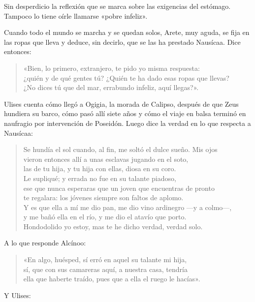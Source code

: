 Sin desperdicio la reflexión que se marca sobre las exigencias del estómago. Tampoco lo tiene oírle llamarse «pobre infeliz».

Cuando todo el mundo se marcha y se quedan solos, Arete, muy aguda, se fija en las ropas que lleva y deduce, sin decirlo, que se las ha prestado Nausícaa. Dice entonces:

\begin{verse}
«Bien, lo primero, extranjero, te pido yo misma respuesta:\\
¿quién y de qué gentes tú? ¿Quién te ha dado esas ropas que llevas?\\
¿No dices tú que del mar, errabundo infeliz, aquí llegas?».
\end{verse}

Ulises cuenta cómo llegó a Ogigia, la morada de Calipso, después de que Zeus hundiera su barco, cómo pasó allí siete años y cómo el viaje en balsa terminó en naufragio por intervención de Poseidón. Luego dice la verdad en lo que respecta a Nausícaa:

\begin{verse}
Se hundía el sol cuando, al fin, me soltó el dulce sueño. Mis ojos\\
vieron entonces allí a unas esclavas jugando en el soto,\\
las de tu hija, y tu hija con ellas, diosa en su coro.\\
Le supliqué; y errada no fue en su talante piadoso,\\
ese que nunca esperaras que un joven que encuentras de pronto\\
te regalara: los jóvenes siempre son faltos de aplomo.\\
Y es que ella a mí me dio pan, me dio vino ardinegro ---y a colmo---,\\
y me bañó ella en el río, y me dio el atavío que porto.\\
Hondodolido yo estoy, mas te he dicho verdad, verdad solo.
\end{verse}

A lo que responde Alcínoo:

\begin{verse}
«En algo, huésped, sí erró en aquel su talante mi hija,\\
sí, que con sus camareras aquí, a nuestra casa, tendría\\
ella que haberte traído, pues que a ella el ruego le hacías».
\end{verse}

Y Ulises:

